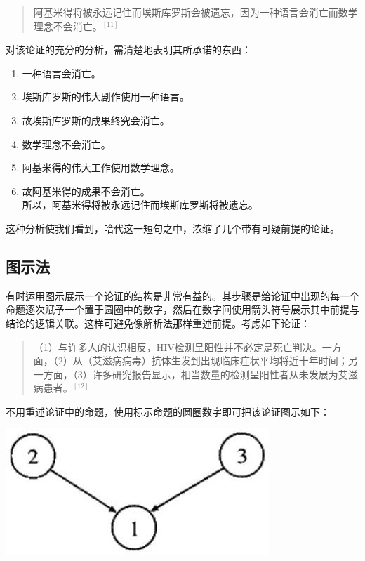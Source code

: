 \begin{quotation}
阿基米得将被永远记住而埃斯库罗斯会被遗忘，因为一种语言会消亡而数学理念不会消亡。${}^{[11]}$
\end{quotation}

对该论证的充分的分析，需清楚地表明其所承诺的东西：

\begin{enumerate}
  \item 一种语言会消亡。
  \item 埃斯库罗斯的伟大剧作使用一种语言。
  \item 故埃斯库罗斯的成果终究会消亡。
  \item 数学理念不会消亡。
  \item 阿基米得的伟大工作使用数学理念。
  \item 故阿基米得的成果不会消亡。\\
  所以，阿基米得将被永远记住而埃斯库罗斯将被遗忘。
\end{enumerate}

这种分析使我们看到，哈代这一短句之中，浓缩了几个带有可疑前提的论证。

\subsection{图示法}

有时运用图示展示一个论证的结构是非常有益的。其步骤是给论证中出现的每一个命题逐次赋予一个置于圆圈中的数字，然后在数字间使用箭头符号展示其中前提与结论的逻辑关联。这样可避免像解析法那样重述前提。考虑如下论证：

\begin{quotation}
（1）与许多人的认识相反，HIV检测呈阳性并不必定是死亡判决。一方面，（2）从（艾滋病病毒）抗体生发到出现临床症状平均将近十年时间；另一方面，（3）许多研究报告显示，相当数量的检测呈阳性者从未发展为艾滋病患者。${}^{[12]}$
\end{quotation}

不用重述论证中的命题，使用标示命题的圆圈数字即可把该论证图示如下：

\begin{center}
\includegraphics[width=\textwidth]{images/2025_05_15_6a28331d5e7c993ad07ag-030.jpg}
\end{center}

